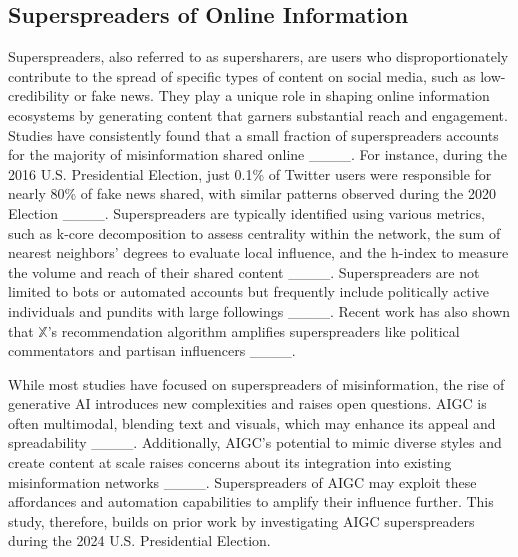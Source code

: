 \subsection{Superspreaders of Online Information}
Superspreaders, also referred to as supersharers, are users who disproportionately contribute to the spread of specific types of content on social media, such as low-credibility or fake news. They play a unique role in shaping online information ecosystems by generating content that garners substantial reach and engagement. Studies have consistently found that a small fraction of superspreaders accounts for the majority of misinformation shared online ____. For instance, during the 2016 U.S. Presidential Election, just 0.1\% of Twitter users were responsible for nearly 80\% of fake news shared, with similar patterns observed during the 2020 Election ____.  Superspreaders are typically identified using various metrics, such as k-core decomposition to assess centrality within the network, the sum of nearest neighbors' degrees to evaluate local influence, and the h-index to measure the volume and reach of their shared content ____. Superspreaders are not limited to bots or automated accounts but frequently include politically active individuals and pundits with large followings ____. Recent work has also shown that $\mathbb{X}$'s recommendation algorithm amplifies superspreaders like political commentators and partisan influencers ____. 

While most studies have focused on superspreaders of misinformation, the rise of generative AI introduces new complexities and raises open questions. AIGC is often multimodal, blending text and visuals, which may enhance its appeal and spreadability ____. Additionally, AIGC's potential to mimic diverse styles and create content at scale raises concerns about its integration into existing misinformation networks ____. Superspreaders of AIGC may exploit these affordances and automation capabilities to amplify their influence further. This study, therefore, builds on prior work by investigating AIGC superspreaders during the 2024 U.S. Presidential Election.